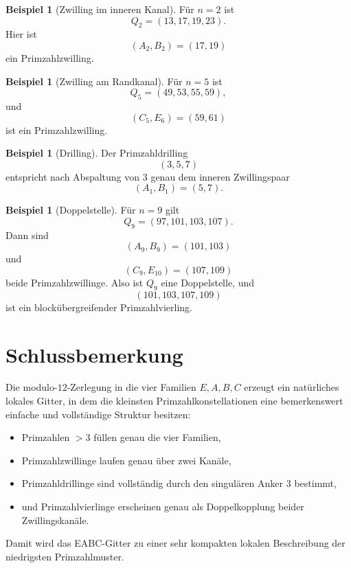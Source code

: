 \documentclass[11pt,a4paper]{article}
\theoremstyle{definition}
\newtheorem{beispiel}[satz]{Beispiel}
\theoremstyle{remark}
\begin{document}
	\begin{beispiel}[Zwilling im inneren Kanal]
		Für \(n=2\) ist
		\[
		Q_2=(13,17,19,23).
		\]
		Hier ist
		\[
		(A_2,B_2)=(17,19)
		\]
		ein Primzahlzwilling.
	\end{beispiel}
	
	\begin{beispiel}[Zwilling am Randkanal]
		Für \(n=5\) ist
		\[
		Q_5=(49,53,55,59),
		\]
		und
		\[
		(C_5,E_6)=(59,61)
		\]
		ist ein Primzahlzwilling.
	\end{beispiel}
	
	\begin{beispiel}[Drilling]
		Der Primzahldrilling
		\[
		(3,5,7)
		\]
		entspricht nach Abspaltung von \(3\) genau dem inneren Zwillingspaar
		\[
		(A_1,B_1)=(5,7).
		\]
	\end{beispiel}
	
	\begin{beispiel}[Doppelstelle]
		Für \(n=9\) gilt
		\[
		Q_9=(97,101,103,107).
		\]
		Dann sind
		\[
		(A_9,B_9)=(101,103)
		\]
		und
		\[
		(C_9,E_{10})=(107,109)
		\]
		beide Primzahlzwillinge. Also ist \(Q_9\) eine Doppelstelle, und
		\[
		(101,103,107,109)
		\]
		ist ein blockübergreifender Primzahlvierling.
	\end{beispiel}
	
	\section{Schlussbemerkung}
	
	Die modulo-\(12\)-Zerlegung in die vier Familien \(E,A,B,C\) erzeugt ein natürliches lokales Gitter,
	in dem die kleinsten Primzahlkonstellationen eine bemerkenswert einfache und vollständige Struktur
	besitzen:
	
	\begin{itemize}[itemsep=0.25em]
		\item Primzahlen \(>3\) füllen genau die vier Familien,
		\item Primzahlzwillinge laufen genau über zwei Kanäle,
		\item Primzahldrillinge sind vollständig durch den singulären Anker \(3\) bestimmt,
		\item und Primzahlvierlinge erscheinen genau als Doppelkopplung beider Zwillingskanäle.
	\end{itemize}
	
	Damit wird das EABC-Gitter zu einer sehr kompakten lokalen Beschreibung der niedrigsten
	Primzahlmuster.
	
\end{document}
